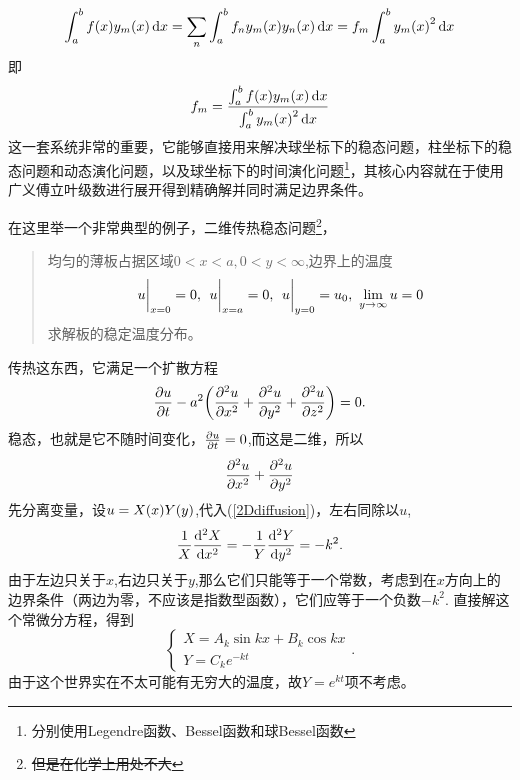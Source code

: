 \documentclass[12pt,a4paper,openany,twoside]{book}
\numberwithin{equation}{section}
\begin{document}
        \begin{equation*}
          \int^b_a{f\qty(x)y_m\qty(x)\dd{x}} =\sum_n{\int^b_a{f_n y_m\qty(x)y_n\qty(x)\dd{x}}}= f_m\int^b_a{y_m\qty(x)^2\dd{x}} 
        \end{equation*} 
        即
        \begin{equation*}
          f_m=\frac{\int^b_a{f\qty(x)y_m\qty(x)\dd{x}}}{\int^b_a{y_m\qty(x)^2\dd{x}}}
        \end{equation*} 
        这一套系统非常的重要，它能够直接用来解决球坐标下的稳态问题，柱坐标下的稳态问题和动态演化问题，以及球坐标下的时间演化问题\footnote{分别使用Legendre函数、Bessel函数和球Bessel函数}，其核心内容就在于使用广义傅立叶级数进行展开得到精确解并同时满足边界条件。

        在这里举一个非常典型的例子，二维传热稳态问题\footnote{\sout{但是在化学上用处不大}}，
        \begin{quote}
          均匀的薄板占据区域$0<x<a,0<y<\infty$,边界上的温度
          \begin{equation*}
            \eval{u}_{x=0}=0,\ \eval{u}_{x=a}=0,\ \eval{u}_{y=0}=u_0,\ \lim_{y\to\infty}u=0
          \end{equation*} 
          求解板的稳定温度分布。
        \end{quote}
        传热这东西，它满足一个扩散方程
        \begin{equation}
          \pdv{u}{t}-a^2\qty(\pdv[2]{u}{x}+\pdv[2]{u}{y}+\pdv[2]{u}{z})=0.
        \end{equation}
        稳态，也就是它不随时间变化，$\pdv{u}{t}=0$,而这是二维，所以
        \begin{equation}
          \pdv[2]{u}{x}+\pdv[2]{u}{y}
          \label{2Ddiffusion}
        \end{equation}
        先分离变量，设$u=X\qty(x)Y\qty(y)$,代入(\ref{2Ddiffusion})，左右同除以$u$,
        \begin{equation}
          \frac{1}{X}\dv[2]{X}{x}=-\frac{1}{Y}\dv[2]{Y}{y}=-k^2.
        \end{equation}
        由于左边只关于$x$,右边只关于$y$,那么它们只能等于一个常数，考虑到在$x$方向上的边界条件（两边为零，不应该是指数型函数），它们应等于一个负数$-k^2$.
        直接解这个常微分方程，得到
        \begin{equation}
          \begin{cases}
            X=A_k\sin{kx}+B_k\cos{kx}\\
            Y=C_k e^{-kt}
          \end{cases}.
        \end{equation}
        由于这个世界实在不太可能有无穷大的温度，故$Y=e^{kt}$项不考虑。
\end{document}
